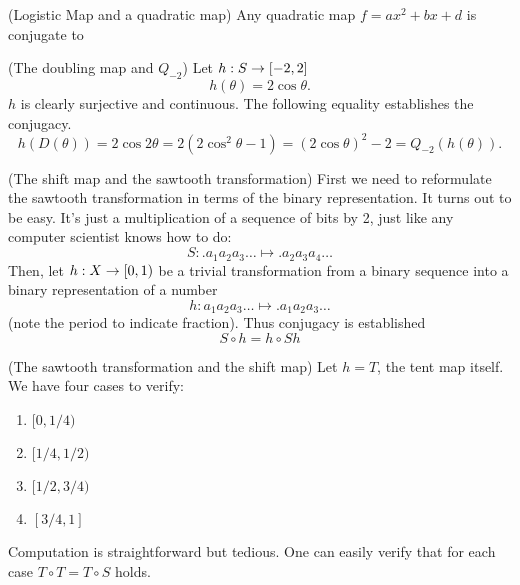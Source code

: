 \documentclass[11pt]{book}
\begin{document}
\begin{proposition}
  (Logistic Map and a quadratic map)
  Any quadratic map $f = ax^2 + bx + d$ is conjugate to 
\end{proposition}

\begin{proposition}
  (The doubling map and $Q_{-2}$)
  Let $h: S \rightarrow [-2,2]$
  \begin{equation*}
    h(\theta) = 2\cos\theta.
  \end{equation*}
  $h$ is clearly surjective and continuous.
  The following equality establishes the conjugacy.
  \begin{equation*}
    h(D(\theta)) = 2\cos2\theta = 2(2\cos^2\theta - 1) = (2\cos\theta)^2 - 2 = Q_{-2}(h(\theta)).
  \end{equation*}
\end{proposition}

\begin{proposition}
  (The shift map and the sawtooth transformation)
  First we need to reformulate the sawtooth transformation in terms of the binary representation.
  It turns out to be easy. It's just a multiplication of a sequence of bits by 2, just like any computer scientist knows how to do:
  \begin{equation*}
    S: .a_1a_2a_3\ldots \mapsto .a_2a_3a_4\ldots
  \end{equation*}
  Then, let $h: X \rightarrow [0,1)$ be a trivial transformation from a binary sequence into a binary representation of a number
    \begin{equation*}
      h: a_1a_2a_3\ldots \mapsto .a_1a_2a_3\ldots
    \end{equation*}
    (note the period to indicate fraction).
  Thus conjugacy is established
  \begin{equation*}
    S \circ h = h \circ Sh
  \end{equation*}
  \end{proposition}

  \begin{proposition}
    (The sawtooth transformation and the shift map)
    Let $h = T$, the tent map itself. We have four cases to verify:
    \begin{enumerate}[$(i)$]
      \item $[0,1/4)$
      \item $[1/4, 1/2)$
      \item $[1/2, 3/4)$
      \item $[3/4, 1]$
    \end{enumerate}
    Computation is straightforward but tedious. One can easily verify that
    for each case $T\circ T = T\circ S$ holds.
  \end{proposition}
\end{document}
